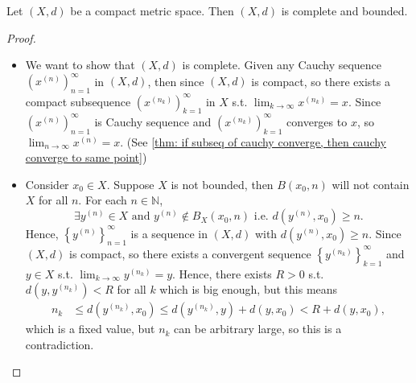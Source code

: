 \begin{proposition} \label{prop: compact means complete and bounded}
    Let \((X, d)\) be a compact metric space. Then \((X, d)\) is complete and bounded.  
\end{proposition}
\begin{proof}
    \vphantom{text}
    \begin{itemize}
        \item We want to show that \((X, d)\) is complete. Given any Cauchy sequence \(\left( x^{(n)} \right)_{n=1}^{\infty}  \)  in \((X, d)\), then since \((X, d)\) is compact, so there exists a compact subsequence \(\left( x^{(n_k)} \right)_{k=1}^{\infty}  \) in \(X\) s.t. \(\lim_{k \to \infty} x^{(n_k)} = x \). Since \(\left( x^{(n)} \right)_{n=1}^{\infty}  \) is Cauchy sequence and \(\left( x^{(n_k)} \right)_{k=1}^{\infty}  \) converges to \(x\), so \(\lim_{n \to \infty} x^{(n)} = x \). (See \autoref{thm: if subseq of cauchy converge, then cauchy converge to same point})  
        \item Consider \(x_0 \in X\). Suppose \(X\) is not bounded, then \(B(x_0, n)\) will not contain \(X\) for all \(n\). For each \(n \in \mathbb{N} \),
        \[
            \exists y^{(n)} \in X \text{ and } y^{(n)} \notin B_X(x_0, n) \text{ i.e. } d\left( y^{(n)}, x_0 \right) \ge n. 
        \]
        Hence, \(\left\{ y^{(n)} \right\}_{n=1}^{\infty}  \) is a sequence in \((X, d)\) with \(d\left( y^{(n)}, x_0\right) \ge n \). Since \((X, d)\) is compact, so there exists a convergent sequence \(\left\{ y^{(n_k)} \right\}_{k=1}^{\infty}  \) and \(y \in X\) s.t. \(\lim_{k \to \infty} y^{(n_k)} = y \). Hence, there exists \(R > 0\) s.t. \(d\left( y, y^{(n_k)} \right) < R \) for all \(k\) which is big enough, but this means 
        \begin{align*}
            n_k &\le d\left( y^{(n_k)}, x_0 \right) \le d\left( y^{(n_k)}, y \right) + d(y, x_0) < R + d(y, x_0),  
        \end{align*}  which is a fixed value, but \(n_k\) can be arbitrary large, so this is a contradiction.       
    \end{itemize}
\end{proof}


